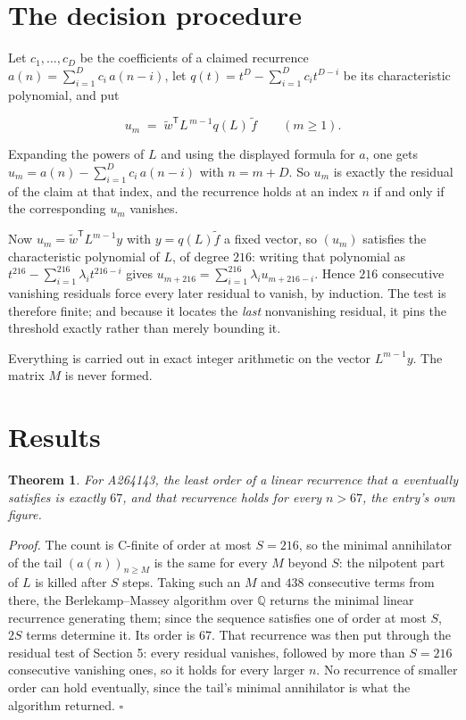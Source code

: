 \documentclass[11pt]{article}
\newtheorem{theorem}{Theorem}
\theoremstyle{definition}
\begin{document}
\section{The decision procedure}

Let $c_1,\dots,c_D$ be the coefficients of a claimed recurrence $a(n) = \sum_{i=1}^{D} c_i\,a(n-i)$, let $q(t) = t^{D} - \sum_{i=1}^{D} c_i t^{D-i}$ be its characteristic polynomial, and put

\[u_m \;=\; \tilde w^{\mathsf T} L^{\,m-1} q(L)\,\tilde f \qquad (m \ge 1).\]

Expanding the powers of $L$ and using the displayed formula for $a$, one gets $u_m = a(n) - \sum_{i=1}^{D} c_i\,a(n-i)$ with $n = m + D$. So $u_m$ is exactly the residual of the claim at that index, and the recurrence holds at an index $n$ if and only if the corresponding $u_m$ vanishes.

Now $u_m = \tilde w^{\mathsf T} L^{m-1} y$ with $y = q(L)\tilde f$ a fixed vector, so $(u_m)$ satisfies the characteristic polynomial of $L$, of degree $216$: writing that polynomial as $t^{216} - \sum_{i=1}^{216} \lambda_i t^{216-i}$ gives $u_{m+216} = \sum_{i=1}^{216} \lambda_i u_{m+216-i}$. Hence $216$ consecutive vanishing residuals force every later residual to vanish, by induction. The test is therefore finite; and because it locates the {\itshape last} nonvanishing residual, it pins the threshold exactly rather than merely bounding it.

Everything is carried out in exact integer arithmetic on the vector $L^{m-1}y$. The matrix $M$ is never formed.

\section{Results}

\begin{theorem} For A264143, the least order of a linear recurrence that $a$ eventually satisfies is exactly $67$, and that recurrence holds for every $n > 67$, the entry's own figure.\end{theorem}

{\itshape Proof.} The count is C-finite of order at most $S = 216$, so the minimal annihilator of the tail $(a(n))_{n \ge M}$ is the same for every $M$ beyond $S$: the nilpotent part of $L$ is killed after $S$ steps. Taking such an $M$ and $438$ consecutive terms from there, the Berlekamp--Massey algorithm over $\mathbb{Q}$ returns the minimal linear recurrence generating them; since the sequence satisfies one of order at most $S$, $2S$ terms determine it. Its order is $67$. That recurrence was then put through the residual test of Section 5: every residual vanishes, followed by more than $S = 216$ consecutive vanishing ones, so it holds for every larger $n$. No recurrence of smaller order can hold eventually, since the tail's minimal annihilator is what the algorithm returned. $\square$
\end{document}
